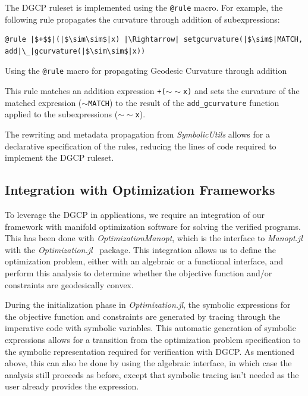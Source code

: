 \documentclass[twoside,11pt]{article}
\begin{document}
The DGCP ruleset is implemented using the \texttt{@rule} macro. For example, the following rule propagates the curvature through addition of subexpressions:

\begin{listing}[h!]
\label{rulecurv}
\begin{verbatim}
@rule |$+$$|(|$\sim\sim$|x) |\Rightarrow| setgcurvature(|$\sim$|MATCH, add|\_|gcurvature(|$\sim\sim$|x))
\end{verbatim}
\caption{Using the \texttt{@rule} macro for propagating Geodesic Curvature through addition}
\end{listing}

This rule matches an addition expression \texttt{+($\sim\sim$x)} and sets the curvature of the matched expression (\texttt{$\sim$MATCH}) to the result of the \texttt{add\_gcurvature} function applied to the subexpressions (\texttt{$\sim\sim$x}).

The rewriting and metadata propagation from \textsl{SymbolicUtils} allows for a declarative specification of the rules, reducing the lines of code required to implement the DGCP ruleset.

\subsection{Integration with Optimization Frameworks}

To leverage the DGCP in applications, we require an integration of our framework with manifold optimization software for solving the verified programs. This has been done with \textsl{OptimizationManopt}, which is the interface to \textsl{Manopt.jl} with the \textsl{Optimization.jl}~\citep{vaibhav_kumar_dixit_2023_7738525} package. This integration allows us to define the optimization problem, either with an algebraic or a functional interface, and perform this analysis to determine whether the objective function and/or constraints are geodesically convex.

During the initialization phase in \textsl{Optimization.jl}, the symbolic expressions for the objective function and constraints are generated by tracing through the imperative code with symbolic variables. This automatic generation of symbolic expressions allows for a transition from the optimization problem specification to the symbolic representation required for verification with DGCP. As mentioned above, this can also be done by using the algebraic interface, in which case the analysis still proceeds as before, except that symbolic tracing isn't needed as the user already provides the expression.
\end{document}
